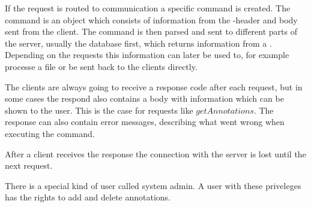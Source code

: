 If the request is routed to communication a specific command is
created. The command is an object which consists of information from
the -header and  body sent from the
client. The command is then parsed and sent to different parts of the
server, usually the database first, which returns information from a
. Depending on the requests this information can later
be used to, for example processe a file or be sent back to the clients
directly.

The clients are always going to receive a response code after each
request, but in some cases the respond also contains a 
body with information which can be shown to the user. This is the case
for requests like $getAnnotations$. The response can also contain
error messages, describing what went wrong when executing the command.

After a client receives the response the connection with the server is
lost until the next request.

There is a special kind of user called system admin. A user with these
priveleges has the rights to add and delete annotations.
